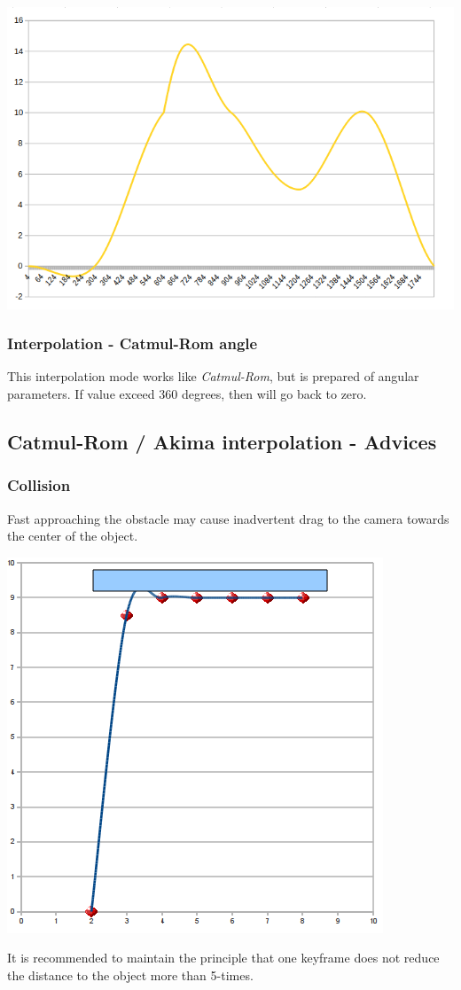 \includegraphics[width=0.5\linewidth]{img/manual/media/interpolation_catmulrom.png}

\subsubsection{Interpolation - Catmul-Rom
	angle}\label{interpolation-catmul-rom-angle}

This interpolation mode works like \emph{Catmul-Rom}, but is prepared of angular
parameters. If value exceed 360 degrees, then will go back to zero.

\subsection{Catmul-Rom / Akima interpolation -
	Advices}\label{catmul-rom-akima-interpolation---advices}

\subsubsection{Collision}\label{collision}

Fast approaching the obstacle may cause inadvertent drag to the camera towards
the center of the object. 
\nopagebreak

\includegraphics[width=0.4\linewidth]{img/manual/media/catmull-rom_collision.png}

It is recommended to maintain the principle that one
keyframe does not reduce the distance to the object more than 5-times.
\nopagebreak

